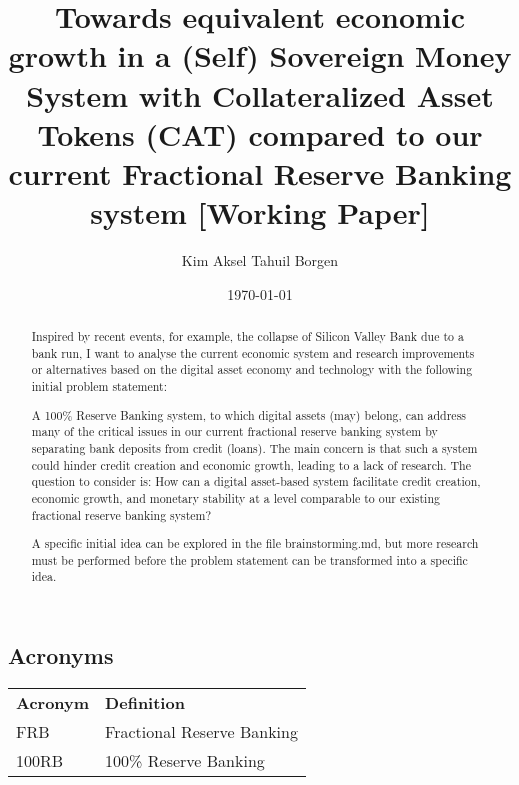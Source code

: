 \documentclass{article}
\title{Towards equivalent economic growth in a (Self) Sovereign Money System with Collateralized Asset Tokens (CAT) compared to our current Fractional Reserve Banking system [Working Paper]}
\author{Kim Aksel Tahuil Borgen}
\date{\today}
\begin{document}
\maketitle
\begin{abstract}
    Inspired by recent events, for example, the collapse of Silicon Valley Bank due to a bank run, I want to analyse the current economic system and research improvements or alternatives based on the digital asset economy and technology with the following initial problem statement:

    A 100\% Reserve Banking system, to which digital assets (may) belong, can address many of the critical issues in our current fractional reserve banking system by separating bank deposits from credit (loans). The main concern is that such a system could hinder credit creation and economic growth, leading to a lack of research. The question to consider is: How can a digital asset-based system facilitate credit creation, economic growth, and monetary stability at a level comparable to our existing fractional reserve banking system? 
    
    A specific initial idea can be explored in the file brainstorming.md, but more research must be performed before the problem statement can be transformed into a specific idea. 
\end{abstract}

\subsection{Acronyms}

\begin{tabular}{ll}
\textbf{Acronym} & \textbf{Definition} \\
FRB & Fractional Reserve Banking \\
100RB & 100\% Reserve Banking \\
\end{tabular}





\printbibliography
\end{document}
